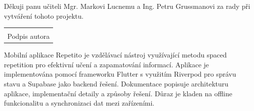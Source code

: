 \documentclass[12pt, a4paper, oneside]{report}
\newcommand\datumOdevzdani{1. 1. 2025} %
\begin{document}
	\clearpage %
	
	\tableofcontents
	\clearpage


	
	\noindent Děkuji panu učiteli Mgr. Markovi Lucnemu a Ing. Petru Grussmanovi za rady při vytváření tohoto projektu.
	
	\vspace*{0.7\textheight} %

	\vfill
	\noindent{V Opavě \datumOdevzdani\\}
	\noindent
	\begin{minipage}{\linewidth}
		\hspace{9.5cm} 
		\begin{tabular}{@{}p{6cm}@{}}
			\dotfill \\
			Podpis autora
		\end{tabular}
	\end{minipage}
	
	\clearpage %

	Mobilní aplikace Repetito je vzdělávací nástroj využívající metodu spaced repetition pro efektivní učení a zapamatování informací. Aplikace je implementována pomocí frameworku Flutter s využitím Riverpod pro správu stavu a Supabase jako backend řešení. Dokumentace popisuje architekturu aplikace, implementační detaily a způsoby řešení. Důraz je kladen na offline funkcionalitu a synchronizaci dat mezi zařízeními.

	\vspace{18pt}
\end{document}
